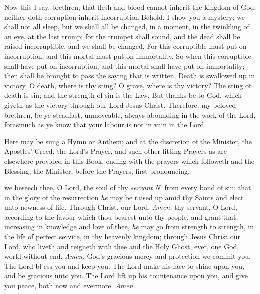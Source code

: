 Now this I say, brethren, that flesh and blood cannot inherit the kingdom of God; neither doth corruption inherit incorruption Behold, I show you a mystery: we shall not all sleep, but we shall all be changed, in a moment, in the twinkling of an eye, at the last trump: for the trumpet shall sound, and the dead shall be raised incorruptible, and we shall be changed. For this corruptible must put on incorruption, and this mortal must put on immortality. So when this corruptible shall have put on incorruption, and this mortal shall have put on immortality; then shall be brought to pass the saying that is written, Death is swallowed up in victory. O death, where is thy sting? O grave, where is thy victory? The sting of death is sin; and the strength of sin is the Law. But thanks be to God, which giveth us the victory through our Lord Jesus Christ. Therefore, my beloved brethren, be ye steadfast, unmoveable, always abounding in the work of the Lord, forasmuch as ye know that your labour is not in vain in the Lord.
 
\begin{rubric}
	Here may be sung a Hymn or Anthem; and at the discretion of the Minister, the Apostles' Creed, the Lord's Prayer, and such other fitting Prayers as are elsewhere provided in this Book, ending with the prayers which followeth and the Blessing; the Minister, before the Prayers, first pronouncing,
\end{rubric}
{} we beseech thee, O Lord, the soul of thy \textit{servant} \textit{N.} from every bond of sin: that in the glory of the resurrection \textit{he} may be raised up amid thy Saints and elect unto newness of life. Through Christ, our Lord. \textit{Amen.}
 thy servant, O Lord, according to the favour which thou bearest unto thy people, and grant that, increasing in knowledge and love of thee, \textit{he} may go from strength to strength, in the life of perfect service, in thy heavenly kingdom; through Jesus Christ our Lord, who liveth and reigneth with thee and the Holy Ghost, ever, one God, world without end. \textit{Amen.}
 God's gracious mercy and protection we commit you. The Lord bl {} ess you and keep you. The Lord make his face to shine upon you, and be gracious unto you. The Lord lift up his countenance upon you, and give you peace, both now and evermore. \textit{Amen.}

